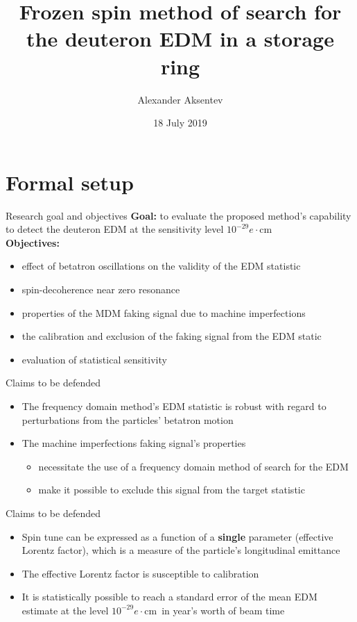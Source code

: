 \documentclass[14pt]{beamer}
\title[Thesis presentation]{Frozen spin method of search for the deuteron EDM in a storage ring}
\author[A. Aksentev]{Alexander Aksentev \inst{1,2}}
\institute[NRNU MEPhI]{
	\inst{1} Forschungszentrum J\"ulich \and%
	\inst{2} NRNU ``MEPhI''
}
\date{18 July 2019}
\renewcommand{\ecm}{$e\cdot$cm}
\begin{document}
	\maketitle
	
	
\section{Formal setup}
\begin{frame}{Research goal and objectives}
	\textbf{Goal:} to evaluate the proposed method's capability to detect the deuteron EDM at the sensitivity level $10^{-29}$\ecm \\
	\pause
	\textbf{Objectives:}
	\begin{itemize}
		\item effect of betatron oscillations on the validity of the EDM statistic
		\item spin-decoherence near zero resonance
		\item properties of the MDM faking signal due to machine imperfections
		\item the calibration and exclusion of the faking signal from the EDM static
		\item evaluation of statistical sensitivity
	\end{itemize}
\end{frame}

\begin{frame}{Claims to be defended}
	\begin{itemize}[<+->]
		\item The frequency domain method's EDM statistic is robust with regard to perturbations from the particles' betatron motion
		\item The machine imperfections faking signal's properties
		\begin{itemize}
			\item necessitate the use of a frequency domain method of search for the EDM
			\item make it possible to exclude this signal from the target statistic
		\end{itemize}
	\end{itemize}
\end{frame}
\begin{frame}{Claims to be defended}
	\begin{itemize}[<+->]
		\item Spin tune can be expressed as a function of a \textbf{single} parameter (effective Lorentz factor), which is a measure of the particle's longitudinal emittance
		\item The effective Lorentz factor is susceptible to calibration
		\item It is statistically possible to reach a standard error of the mean EDM estimate at the level $10^{-29}$\ecm~in year's worth of beam time
	\end{itemize}
\end{frame}
\end{document}
